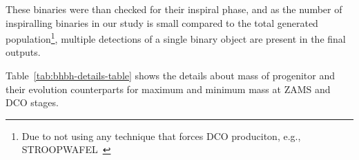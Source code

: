 \documentclass[journal, twocolumn]{IEEEtran}
\newcommand{\mone}[1]{m_{1_{\text{#1}}}}
\newcommand{\mtwo}[1]{m_{2_{\text{#1}}}}
\newcommand{\semaxis}[1]{a_{\text{#1}}}
\newcommand{\ecc}[1]{e_\text{#1}}
\newcommand{\interval}[1]{t_\text{#1}}
\begin{document}

    These binaries were than checked for their inspiral phase, and as the number of inspiralling binaries in our study is small compared to the total generated population\footnote{Due to not using any technique that forces DCO produciton, e.g., STROOPWAFEL~\cite{Broekgaarden2019}}, multiple detections of a single binary object are present in the final outputs.
    
    Table~\ref{tab:bhbh-details-table} shows the details about mass of progenitor and their evolution counterparts for maximum and minimum mass at ZAMS and DCO stages.
    
\end{document}
